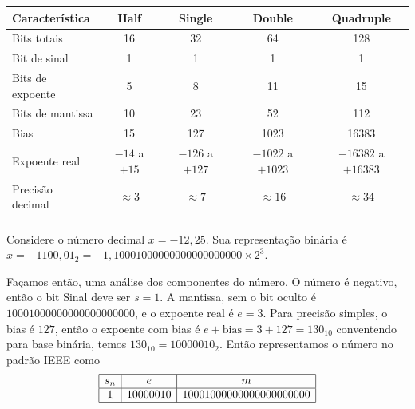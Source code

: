 \begin{center}
  \small
  \begin{tabular}{lcccc}
    \toprule
    \textbf{Característica}
                     & \textbf{Half}
                     & \textbf{Single}
                     & \textbf{Double}
                     & \textbf{Quadruple}
    \\
    \midrule

    Bits totais      & 16                 & 32              & 64                & 128          \\

    Bit de sinal     & 1                  & 1               & 1                 & 1            \\

    Bits de expoente & 5                  & 8               & 11                & 15           \\

    Bits de mantissa & 10                 & 23              & 52                & 112          \\

    Bias             & 15                 & 127             & 1023              & 16383        \\

    Expoente real    & $-14$ a $+15$      & $-126$ a $+127$ & $-1022$ a $+1023$ & $-16382$
    a $+16383$                                                                                 \\

    Precisão decimal & $\approx 3$        & $\approx 7$     & $\approx 16$      & $\approx 34$ \\

    \bottomrule
    \label{tab:precision}
  \end{tabular}
\end{center}

\begin{ex}

  Considere o número decimal \( x = -12{,}25 \). Sua representação binária é $x =
    -1100{,}01_2 = -1{,}10001000000000000000000 \times 2^3$.

  Façamos então, uma análise dos componentes do número. O número é negativo,
  então o bit Sinal deve ser $s = 1$. A mantissa, sem o bit oculto é
  $10001000000000000000000$, e o expoente real é $e = 3$. Para precisão simples,
  o bias é $127$, então o expoente com bias é $e + \text{bias} = 3 + 127 =
    130_{10}$ conventendo para base binária, temos $130_{10} = 10000010_2$. Então
  representamos o número no padrão IEEE como
  \[
    \begin{array}{|c|c|c|} \hline
      s_n & e        & m                       \\ \hline
      1   & 10000010 & 10001000000000000000000 \\ \hline
    \end{array}
  \]
\end{ex}

